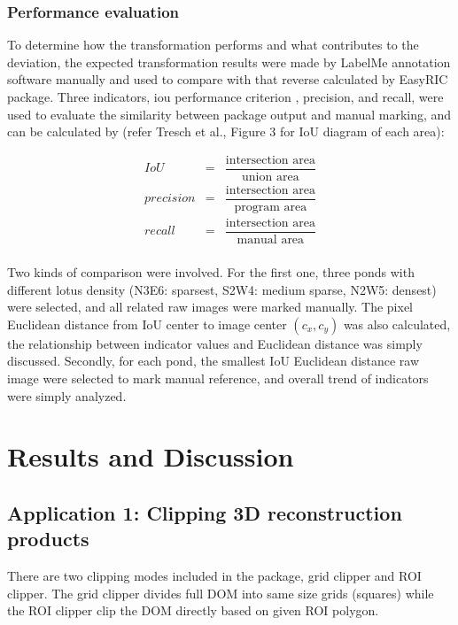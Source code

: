 \documentclass[doublespacing]{configs/bmcart}
\begin{document}
\subsubsection*{Performance evaluation}
To determine how the transformation performs and what contributes to the deviation, the expected transformation results were made by LabelMe annotation software manually and used to compare with that reverse calculated by EasyRIC package. Three indicators, \acrfull*{iou} performance criterion \cite{everingham_pascal_2010}, precision, and recall, were used to evaluate the similarity between package output and manual marking, and can be calculated by (refer Tresch et al., \cite{tresch_easympe_2019} Figure 3 for IoU diagram of each area): 

$$
\begin{array}{lcl}
  IoU & = & \dfrac{\text{intersection area}}{\text{union area}} \\
  precision & = & \dfrac{\text{intersection area}}{\text{program area}} \\
  recall & = & \dfrac{\text{intersection area}}{\text{manual area}} \\
\end{array}
$$

Two kinds of comparison were involved. For the first one, three ponds with different lotus density (N3E6: sparsest, S2W4: medium sparse, N2W5: densest) were selected, and all related raw images were marked manually. The pixel Euclidean distance from IoU center to image center $(c_x, c_y)$ was also calculated, the relationship between indicator values and Euclidean distance was simply discussed. Secondly, for each pond, the smallest IoU Euclidean distance raw image were selected to mark manual reference, and overall trend of indicators were simply analyzed.

\section*{Results and Discussion}

\subsection*{Application 1: Clipping 3D reconstruction products}
There are two clipping modes included in the package, grid clipper and ROI clipper. The grid clipper divides full DOM into same size grids (squares) while the ROI clipper clip the DOM directly based on given ROI polygon. 
\end{document}
